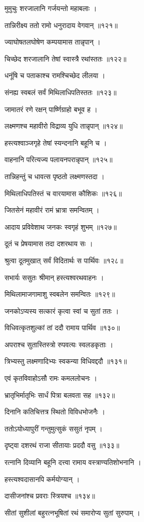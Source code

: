 मुमुचुः शरजालानि गर्जयन्तो महाबलाः ।

तान्निरीक्ष्य ततो रामो धनुरादाय वेगवान् ॥१२१॥

ज्याघोषतलघोषेण कम्पयामास तान्नृपान् ।

चिच्छेद शरजालानि तेषां स्वास्त्रै रथांस्ततः ॥१२२॥

धनूंषि च पताकाश्च रामश्चिच्छेद लीलया ।

संनह्य स्वबलं सर्वं मिथिलाधिपतिस्ततः ॥१२३॥

जामातरं रणे रक्षन् पार्ष्णिग्राहो बभूव ह ।

लक्ष्मणश्च महावीरो विद्राव्य युधि तान्नृपान् ॥१२४॥

हस्त्यश्वाञ्जगृहे तेषां स्यन्दनानि बहूनि च ।

वाहनानि परित्यज्य पलायनपरान्नृपान् ॥१२५॥

तान्निहन्तुं च धावत्स पृष्ठतो लक्ष्मणस्तदा ।

मिथिलाधिपतिस्तं च वारयामास कौशिकः ॥१२६॥

जितसेनं महावीरं रामं भ्रात्रा समन्वितम् ।

आदाय प्रविवेशाथ जनकः स्वगृहं शुभम् ॥१२७॥

दूतं च प्रेषयामास तदा दशरथाय सः ।

श्रुत्वा दूतमुखात् सर्वं विदितार्थः स पार्थिवः ॥१२८॥

सभार्यः ससुतः श्रीमान् हस्त्यश्वरथवाहनः ।

मिथिलामाजगामाशु स्वबलेन समन्वितः ॥१२९॥

जनकोऽप्यस्य सत्कारं कृत्वा स्वां च सुतां ततः ।

विधिवत्कृतशुल्कां तां ददौ रामाय पार्थिव ॥१३०॥

अपराश्च सुतास्तिस्त्रो रुपवत्यः स्वलडकृताः ।

त्रिभ्यस्तु लक्ष्मणादिभ्यः स्वकन्या विधिवद्ददौ ॥१३१॥

एवं कृतविवाहोऽसौ रामः कमललोचनः ।

भ्रातृभिर्मातृभिः सार्धं पित्रा बलवता सह ॥१३२॥

दिनानि कतिचित्तत्र स्थितो विविधभोजनैः ।

ततोऽयोध्यापुरीं गन्तुमुत्सुकं ससुतं नृपम् ।

दृष्ट्वा दशरथं राजा सीतायाः प्रददौ वसु ॥१३३॥

रत्नानि दिव्यानि बहूनि दत्त्वा रामाय वस्त्राण्यतिशोभनानि ।

हस्त्यश्वदासानपि कर्मयोग्यान् ।

दासीजनांश्च प्रवराः स्त्रियश्च ॥१३४॥

सीतां सुशीलां बहुरत्नभूषितां रथं समारोप्य सुतां सुरुपाम् ।

